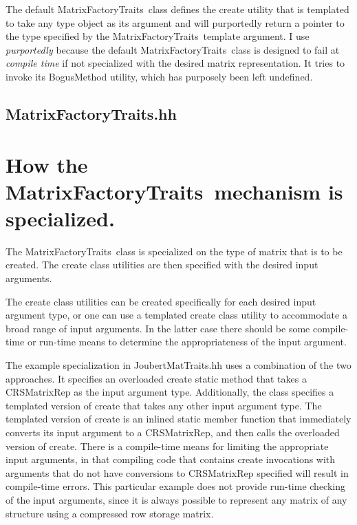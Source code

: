 \documentclass[11pt]{nmemo}
\newcommand{\cxxcode}{\color{codecolor}}
\newcommand{\code}[1]{\textcolor{codecolor}{#1}}
\newcommand{\MFT}{\code{MatrixFactoryTraits}\ }
\begin{document}
The default \MFT class defines the \code{create} utility that is
templated to take any type object as its
argument and will purportedly return a pointer to the type specified
by the \MFT template argument.
I use \emph{purportedly} because the default \MFT class is designed
to fail at \emph{compile time}
if not specialized with the desired matrix representation.
It tries to invoke its \code{BogusMethod} utility, which has purposely
been left undefined.

\subsection{MatrixFactoryTraits.hh}

\begin{ttfamily}
\begin{small}
\cxxcode

\end{small}
\end{ttfamily}

\section{How the \MFT mechanism is specialized.}

The \MFT class is specialized on the type of matrix that is to be created.
The \code{create} class utilities are then specified with the desired input
arguments.

The \code{create} class utilities can be created specifically for each desired
input argument type, or one can use a templated \code{create} class utility
to accommodate a broad range of input arguments.
In the latter case there should be some compile-time or run-time means
to determine the appropriateness of the input argument.

The example specialization in \code{JoubertMatTraits.hh} uses a combination
of the two approaches.
It specifies an overloaded \code{create} static method that takes a
\code{CRSMatrixRep} as the
input argument type.
Additionally, the class specifies a templated version of \code{create}
that takes any other input argument type.
The templated version of \code{create} is an inlined static member function
that immediately converts its input argument to a \code{CRSMatrixRep}, and
then calls the overloaded version of \code{create}.
There is a compile-time means for limiting the appropriate input arguments, in
that compiling code that contains \code{create} invocations with
arguments that do not have conversions to \code{CRSMatrixRep} specified
will result in compile-time errors.
This particular example does not provide run-time checking of the input
arguments, since it is always possible to represent any matrix of any
structure using a compressed row storage matrix.
\end{document}
